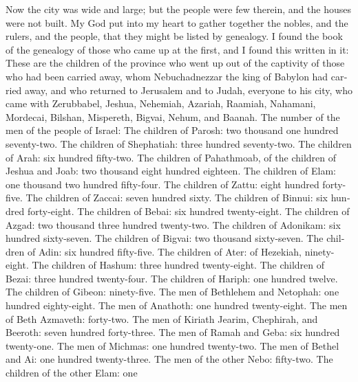 \begin{paracol}{2}
\begin{otherlanguage}{english}
 Now the city was wide and large; but the people were few
therein, and the houses were not built.  My God put into
my heart to gather together the nobles, and the rulers, and the people,
that they might be listed by genealogy. I found the book of the
genealogy of those who came up at the first, and I found this written in
it:  These are the children of the province who went up
out of the captivity of those who had been carried away, whom
Nebuchadnezzar the king of Babylon had carried away, and who returned to
Jerusalem and to Judah, everyone to his city,  who came
with Zerubbabel, Jeshua, Nehemiah, Azariah, Raamiah, Nahamani, Mordecai,
Bilshan, Mispereth, Bigvai, Nehum, and Baanah. The number of the men of
the people of Israel:  The children of Parosh: two
thousand one hundred seventy-two.  The children of
Shephatiah: three hundred seventy-two.  The children of
Arah: six hundred fifty-two.  The children of Pahathmoab,
of the children of Jeshua and Joab: two thousand eight hundred eighteen.
 The children of Elam: one thousand two hundred
fifty-four.  The children of Zattu: eight hundred
forty-five.  The children of Zaccai: seven hundred sixty.
 The children of Binnui: six hundred forty-eight.
 The children of Bebai: six hundred twenty-eight.
 The children of Azgad: two thousand three hundred
twenty-two.  The children of Adonikam: six hundred
sixty-seven.  The children of Bigvai: two thousand
sixty-seven.  The children of Adin: six hundred
fifty-five.  The children of Ater: of Hezekiah,
ninety-eight.  The children of Hashum: three hundred
twenty-eight.  The children of Bezai: three hundred
twenty-four.  The children of Hariph: one hundred twelve.
 The children of Gibeon: ninety-five.  The
men of Bethlehem and Netophah: one hundred eighty-eight. 
The men of Anathoth: one hundred twenty-eight.  The men
of Beth Azmaveth: forty-two.  The men of Kiriath Jearim,
Chephirah, and Beeroth: seven hundred forty-three.  The
men of Ramah and Geba: six hundred twenty-one.  The men
of Michmas: one hundred twenty-two.  The men of Bethel
and Ai: one hundred twenty-three.  The men of the other
Nebo: fifty-two.  The children of the other Elam: one

\end{otherlanguage}
\end{paracol}
